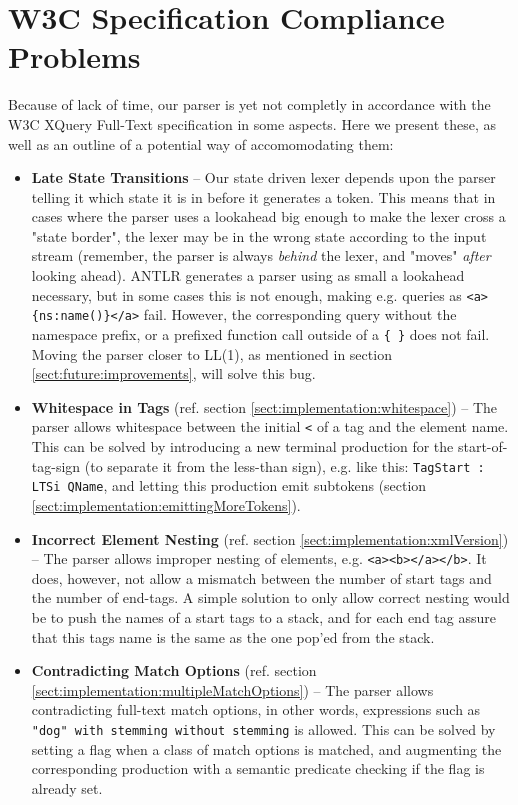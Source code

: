 \section{W3C Specification Compliance Problems}
\label{sect:future:knownBugs}
Because of lack of time, our parser is yet not completly in accordance with the
W3C XQuery Full-Text specification in some aspects. Here we present these, as
well as an outline of a potential way of accomomodating them: 

\begin{itemize}
\item \textbf{Late State Transitions} -- Our state driven lexer depends upon
the parser telling it which state it is in before it generates a token. This means that in cases where the parser uses a lookahead big enough to make the lexer cross a "state border", the lexer may be in the wrong state according to the input stream (remember, the parser is always \emph{behind} the lexer, and "moves" \emph{after} looking ahead). ANTLR generates a parser using as small a lookahead necessary, but in some cases this is not enough, making e.g. queries as \verb!<a>{ns:name()}</a>! fail. However, the corresponding query without the namespace prefix, or a prefixed function call outside of a \verb!{ }! does not fail. Moving the parser closer to LL(1), as mentioned in section \ref{sect:future:improvements}, will solve this bug.

\item \textbf{Whitespace in Tags} (ref. section \ref{sect:implementation:whitespace}) -- The parser allows whitespace between the initial \verb!<! of a tag and the element name. This can be solved by introducing a new terminal production for the start-of-tag-sign (to separate it from the less-than sign), e.g. like this: \verb!TagStart : LTSi QName!, and letting this production emit subtokens (section \ref{sect:implementation:emittingMoreTokens}).

\item \textbf{Incorrect Element Nesting} (ref. section \ref{sect:implementation:xmlVersion}) -- The parser allows improper nesting of elements, e.g. \verb!<a><b></a></b>!. It does, however, not allow a mismatch between the number of start tags and the number of end-tags. A simple solution to only allow correct nesting would be to push the names of a start tags to a stack, and for each end tag assure that this tags name is the same as the one pop'ed from the stack.

\item \textbf{Contradicting Match Options} (ref. section \ref{sect:implementation:multipleMatchOptions}) -- The parser allows contradicting full-text match options, in other words, expressions such as \verb!"dog" with stemming without stemming! is allowed. This can be solved by setting a flag when a class of match options is matched, and augmenting the corresponding production with a semantic predicate checking if the flag is already set.


\end{itemize}
